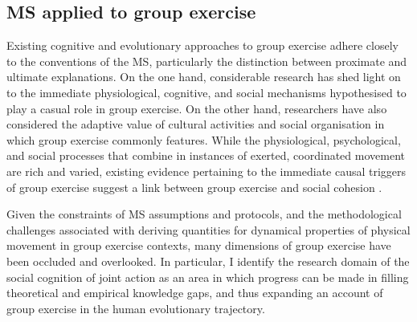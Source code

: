 \subsection{MS applied to group exercise}
Existing cognitive and evolutionary approaches to group exercise adhere closely to the conventions of the MS, particularly the distinction between proximate and ultimate explanations.  On the one hand, considerable research has shed light on to the immediate physiological, cognitive, and social mechanisms hypothesised to play a casual role in group exercise.  On the other hand, researchers have also considered the adaptive value of cultural activities and social organisation in which group exercise commonly features.  While the physiological, psychological, and social processes that combine in instances of exerted, coordinated movement are rich and varied, existing evidence pertaining to the immediate causal triggers of group exercise suggest a link between group exercise and social cohesion \citep{Davis2015,Cohen2017}.

Given the constraints of MS assumptions and protocols, and the methodological challenges associated with deriving quantities for dynamical properties of physical movement in group exercise contexts, many dimensions of group exercise have been occluded and overlooked.  In particular, I identify the research domain of the social cognition of joint action as an area in which progress can be made in filling theoretical and empirical knowledge gaps, and thus expanding an account of group exercise in the human evolutionary trajectory.


